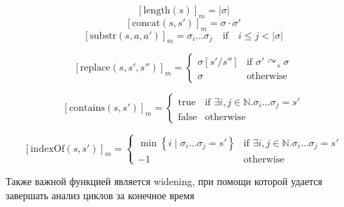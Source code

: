 $$\left[ \text{length}(s) \right]_{m} = |\sigma|$$
$$\left[ \text{concat}(s, s') \right]_{m} = \sigma \cdot \sigma'$$
$$\left[ \text{substr}(s, a, a') \right]_{m} = \sigma_i \dots \sigma_j \quad \text{if} \quad i \leq j < |\sigma|$$


\[
\left[ \text{replace}(s, s', s'') \right]_{m} = 
\begin{cases}
\sigma \left[ s' / s'' \right] & \text{if } \sigma'  \curvearrowright_s \sigma \\
\sigma & \text{otherwise}
\end{cases}
\]

$$\left[ \text{contains}(s, s') \right]_{m} = 
\begin{cases}
\text{true} & \text{if } \exists i, j \in \mathbb{N}. \sigma_i \dots \sigma_j = s' \\
\text{false} & \text{otherwise}
\end{cases}$$

$$\left[ \text{indexOf}(s, s') \right]_{m} = 
\begin{cases}
\min \left\{ i \mid \sigma_i \dots \sigma_j = s' \right\} & \text{if } \exists i, j \in \mathbb{N}. \sigma_i \dots \sigma_j = s' \\
-1 & \text{otherwise}
\end{cases}$$

Также важной функцией является widening, при помощи которой удается завершать анализ циклов за конечное время